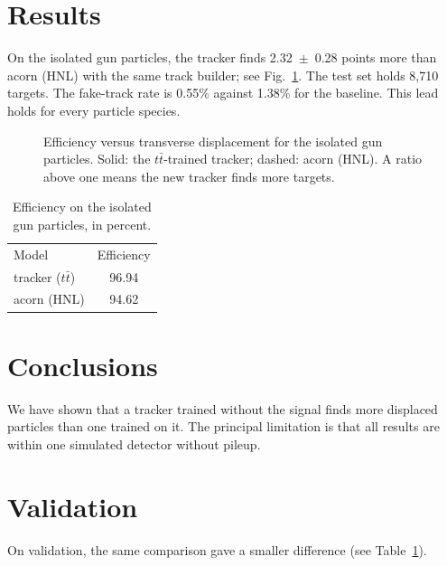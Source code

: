 \documentclass[aps,prd,twocolumn,superscriptaddress,nofootinbib]{revtex4-2}
\newcommand{\ttbar}{\ensuremath{t\bar{t}}}
\begin{document}
\section{Results}
\label{sec:results}
On the isolated gun particles, the tracker finds 2.32~$\pm$~0.28 points more than acorn (HNL) with the same track builder; see Fig.~\ref{fig:eff}.
The test set holds 8,710 targets.
The fake-track rate is 0.55\% against 1.38\% for the baseline.
This lead holds for every particle species.

\begin{figure}[t]
  \centering
  \caption{Efficiency versus transverse displacement for the isolated gun particles. Solid: the \ttbar-trained tracker; dashed: acorn (HNL). A ratio above one means the new tracker finds more targets.}
  \label{fig:eff}
\end{figure}

\begin{table}[b]
  \caption{Efficiency on the isolated gun particles, in percent.}
  \label{tab:eff}
  \begin{tabular}{lc}
    Model & Efficiency \\
    tracker (\ttbar) & 96.94 \\
    acorn (HNL) & 94.62 \\
  \end{tabular}
\end{table}

\section{Conclusions}
\label{sec:concl}
We have shown that a tracker trained without the signal finds more displaced particles than one trained on it.
The principal limitation is that all results are within one simulated detector without pileup.

\appendix
\section{Validation}
\label{app:val}
On validation, the same comparison gave a smaller difference (see Table~\ref{tab:eff}).


\end{document}
